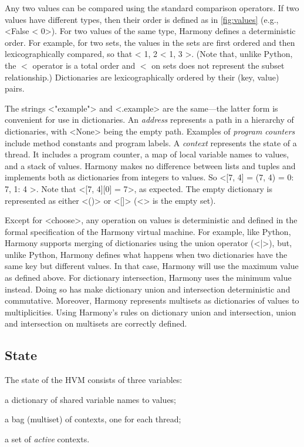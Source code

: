 \documentclass[twocolumn]{article}
\begin{document}
Any two values can be compared using the standard comparison operators.
If two values have different types, then their order is defined as in
\autoref{fig:values} (e.g., <{False < 0}>).
For two values of the same type, Harmony defines a deterministic order.
For example, for two sets, the values in the sets are first ordered and
then lexicographically compared, so that <{{ 1, 2 } < { 1, 3 }}>.
(Note that, unlike Python, the $<$ operator is a total order and
$<$ on sets does not represent the subset relationship.)
Dictionaries are lexicographically ordered by their (key, value) pairs.

The strings <{"example"}> and <{.example}> are the same---the latter
form is convenient for use in dictionaries.
An \emph{address} represents a path in a hierarchy of dictionaries, with
<{None}> being the empty path.
Examples of \emph{program counters} include method constants and program labels.
A \emph{context} represents the state of a thread.  It includes a program
counter, a map of local variable names to values, and a stack of values.
Harmony makes no difference between lists and tuples and implements
both as dictionaries from integers to values.
So <{[7, 4] = (7, 4) = { 0: 7, 1: 4 }}>.
Note that <{[7, 4][0] = 7}>, as expected.
The empty dictionary is represented as either <{()}> or <{[]}>
(<{{}}> is the empty set).

Except for <{choose}>, any operation on values is deterministic and
defined in the formal specification of the Harmony virtual machine.
For example, like Python, Harmony supports merging of dictionaries
using the union operator (<{|}>), but, unlike Python, Harmony defines
what happens when two dictionaries have the same key but different values.
In that case, Harmony will use the maximum value as defined above.
For dictionary  intersection, Harmony uses the minimum value instead.
Doing so has make dictionary union and intersection deterministic and
commutative.  Moreover, Harmony represents multisets as dictionaries
of values to multiplicities.  Using Harmony's rules on dictionary union
and intersection, union and intersection on multisets are correctly
defined.

\subsection{State}

The state of the HVM consists of three variables:
\begin{compactitem}
\item a dictionary of shared variable names to values;
\item a bag (multiset) of contexts, one for each thread;
\item a set of \emph{active} contexts.
\end{compactitem}
\end{document}
